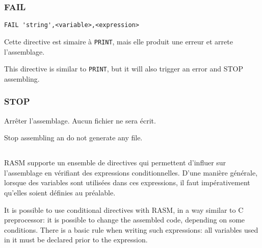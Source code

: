 \subsubsection{FAIL}

\begin{verbatim}
FAIL 'string',<variable>,<expression>
\end{verbatim}

\begin{xfr}
Cette directive est simaire à \texttt{PRINT}, mais elle produit une erreur et arrete l'assemblage.
\end{xfr}

\begin{xen}
This directive is similar to \texttt{PRINT}, but it will also trigger an error and STOP assembling.
\end{xen}

\subsubsection{STOP}

\begin{xfr}
Arrêter l'assemblage. Aucun fichier ne sera écrit.
\end{xfr}

\begin{xen}
Stop assembling an do not generate any file.
\end{xen}



\subsection{}

\begin{xfr}
RASM supporte un ensemble de directives qui permettent d'influer
sur l'assemblage en vérifiant des expressions conditionnelles. D'une manière générale,
lorsque des variables sont utilisées dans ces expressions, il faut impérativement qu'elles
soient définies au préalable.
\end{xfr}


\begin{xen}
It is possible to use conditional directives with RASM, in a way similar to C preprocessor: it is possible to change the assembled code, depending on some conditions. There is a basic rule when writing such expressions: all variables used in it must be declared prior to the expression.
\end{xen}

